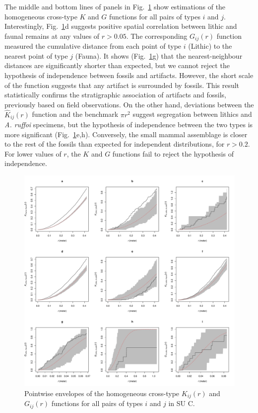 \documentclass[5p,authoryear]{elsarticle} %
\begin{document}
The middle and bottom lines of panels in Fig.~\ref{fig:7} show estimations of the homogeneous cross-type $K$ and $G$ functions for all pairs of types $i$ and $j$. Interestingly, Fig.~\ref{fig:7}d suggests positive spatial correlation between lithic and faunal remains at any values of $r>0.05$. The corresponding $G_{ij}(r)$ function measured the cumulative distance from each point of type $i$ (Lithic) to the nearest point of type $j$ (Fauna). It shows (Fig.~\ref{fig:7}g) that the nearest-neighbour distances are significantly shorter than expected, but we cannot reject the hypothesis of independence between fossils and artifacts. However, the short scale of the function suggests that any artifact is surrounded by fossils. This result statistically confirms the stratigraphic association of artifacts and fossils, previously based on field observations. On the other hand, deviations between the $\hat{K}_{ij}(r)$ function and the benchmark $\pi r^2$ suggest segregation between lithics and \emph{A. ruffoi} specimens, but the hypothesis of independence between the two types is more significant (Fig.~\ref{fig:7}e,h). Conversely, the small mammal assemblage is closer to the rest of the fossils than expected for independent distributions, for $r>0.2$. For lower values of $r$, the $K$ and $G$ functions fail to reject the hypothesis of independence.

\begin{figure}[t]
  \centering
  \includegraphics[width=.8\textwidth]{../artwork/Fig7.pdf}
  \caption{Pointwise envelopes of the homogeneous cross-type $K_{ij}(r)$ and $G_{ij}(r)$ functions for all pairs of types $i$ and $j$ in SU C.}
  \label{fig:7}
\end{figure}
\end{document}
